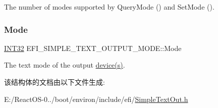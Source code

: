 The number of modes supported by Query\+Mode () and Set\+Mode (). \mbox{\label{struct_e_f_i___s_i_m_p_l_e___t_e_x_t___o_u_t_p_u_t___m_o_d_e_a0b7bba5e8c701dc2047c1470553deaad}} 
\subsubsection{\texorpdfstring{Mode}{Mode}}
{\footnotesize\ttfamily \hyperlink{_processor_bind_8h_a1137216524060afd426c34677fed058b}{I\+N\+T32} E\+F\+I\+\_\+\+S\+I\+M\+P\+L\+E\+\_\+\+T\+E\+X\+T\+\_\+\+O\+U\+T\+P\+U\+T\+\_\+\+M\+O\+D\+E\+::\+Mode}

The text mode of the output \hyperlink{structdevice}{device(s)}. 

该结构体的文档由以下文件生成\+:\begin{DoxyCompactItemize}
\item 
E\+:/\+React\+O\+S-\/0../boot/environ/include/efi/\hyperlink{_simple_text_out_8h}{Simple\+Text\+Out.\+h}\end{DoxyCompactItemize}
